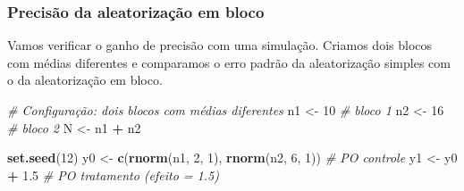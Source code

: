 \documentclass[
]{article}
\newenvironment{Shaded}{\begin{snugshade}}{\end{snugshade}}
\newcommand{\CommentTok}[1]{\textcolor[rgb]{0.56,0.35,0.01}{\textit{#1}}}
\newcommand{\DecValTok}[1]{\textcolor[rgb]{0.00,0.00,0.81}{#1}}
\newcommand{\FloatTok}[1]{\textcolor[rgb]{0.00,0.00,0.81}{#1}}
\newcommand{\FunctionTok}[1]{\textcolor[rgb]{0.13,0.29,0.53}{\textbf{#1}}}
\newcommand{\NormalTok}[1]{#1}
\newcommand{\OtherTok}[1]{\textcolor[rgb]{0.56,0.35,0.01}{#1}}
\newcommand{\SpecialCharTok}[1]{\textcolor[rgb]{0.81,0.36,0.00}{\textbf{#1}}}
\begin{document}
\subsubsection{Precisão da aleatorização em bloco}\label{precisuxe3o-da-aleatorizauxe7uxe3o-em-bloco}

Vamos verificar o ganho de precisão com uma simulação. Criamos dois blocos com médias diferentes e comparamos o erro padrão da aleatorização simples com o da aleatorização em bloco.

\begin{Shaded}
\begin{Highlighting}[]
\CommentTok{\# Configuração: dois blocos com médias diferentes}
\NormalTok{n1 }\OtherTok{\textless{}{-}} \DecValTok{10}  \CommentTok{\# bloco 1}
\NormalTok{n2 }\OtherTok{\textless{}{-}} \DecValTok{16}  \CommentTok{\# bloco 2}
\NormalTok{N }\OtherTok{\textless{}{-}}\NormalTok{ n1 }\SpecialCharTok{+}\NormalTok{ n2}

\FunctionTok{set.seed}\NormalTok{(}\DecValTok{12}\NormalTok{)}
\NormalTok{y0 }\OtherTok{\textless{}{-}} \FunctionTok{c}\NormalTok{(}\FunctionTok{rnorm}\NormalTok{(n1, }\DecValTok{2}\NormalTok{, }\DecValTok{1}\NormalTok{), }\FunctionTok{rnorm}\NormalTok{(n2, }\DecValTok{6}\NormalTok{, }\DecValTok{1}\NormalTok{))  }\CommentTok{\# PO controle}
\NormalTok{y1 }\OtherTok{\textless{}{-}}\NormalTok{ y0 }\SpecialCharTok{+} \FloatTok{1.5}                               \CommentTok{\# PO tratamento (efeito = 1.5)}
\end{Highlighting}
\end{Shaded}
\end{document}
